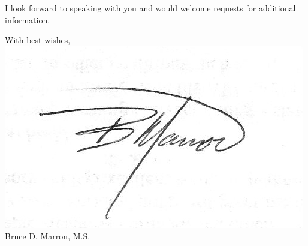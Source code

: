 \documentclass[11 pt,letterpaper]{moderncv}        %
\begin{document}
I look forward to speaking with you and would welcome requests for additional information. 

\noindent With best wishes, \\
\includegraphics[scale=.6]{graphics/signature.jpeg}\\
Bruce D. Marron,  M.S.\\


\end{document}
